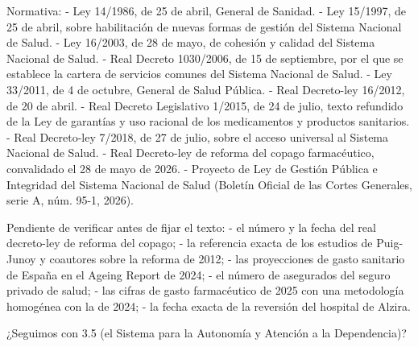 \documentclass[10pt,a4paper]{article}
\begin{document}
Normativa:
- Ley 14/1986, de 25 de abril, General de Sanidad.
- Ley 15/1997, de 25 de abril, sobre habilitación de nuevas formas de gestión del Sistema Nacional de Salud.
- Ley 16/2003, de 28 de mayo, de cohesión y calidad del Sistema Nacional de Salud.
- Real Decreto 1030/2006, de 15 de septiembre, por el que se establece la cartera de servicios comunes del Sistema Nacional de Salud.
- Ley 33/2011, de 4 de octubre, General de Salud Pública.
- Real Decreto-ley 16/2012, de 20 de abril.
- Real Decreto Legislativo 1/2015, de 24 de julio, texto refundido de la Ley de garantías y uso racional de los medicamentos y productos sanitarios.
- Real Decreto-ley 7/2018, de 27 de julio, sobre el acceso universal al Sistema Nacional de Salud.
- Real Decreto-ley de reforma del copago farmacéutico, convalidado el 28 de mayo de 2026.
- Proyecto de Ley de Gestión Pública e Integridad del Sistema Nacional de Salud (Boletín Oficial de las Cortes Generales, serie A, núm. 95-1, 2026).

Pendiente de verificar antes de fijar el texto:
- el número y la fecha del real decreto-ley de reforma del copago;
- la referencia exacta de los estudios de Puig-Junoy y coautores sobre la reforma de 2012;
- las proyecciones de gasto sanitario de España en el Ageing Report de 2024;
- el número de asegurados del seguro privado de salud;
- las cifras de gasto farmacéutico de 2025 con una metodología homogénea con la de 2024;
- la fecha exacta de la reversión del hospital de Alzira.

¿Seguimos con 3.5 (el Sistema para la Autonomía y Atención a la Dependencia)?
\end{document}
